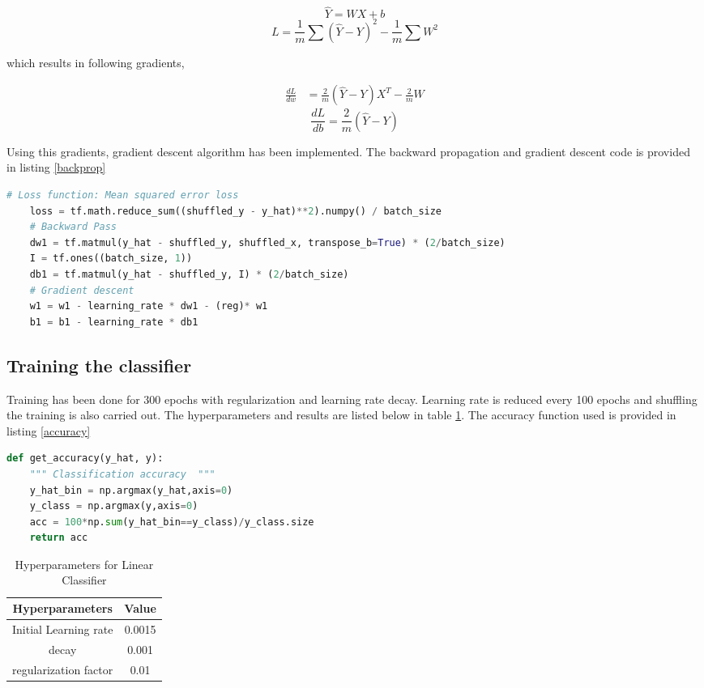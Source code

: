 \documentclass[a4paper, 12pt]{article}
\begin{document}
			\begin{multicols}{2}
				\noindent
				\begin{equation}
					\hat{Y}  = WX + b
				\end{equation}
				\begin{equation}
						L = \frac{1}{m}\sum{(\hat{Y}-Y)^2} - \frac{1}{m}\sum W^2
				\end{equation}
			\end{multicols}
			which results in following gradients,
			\noindent
			\begin{multicols}{2}
				\noindent
				\begin{align*}
					\frac{dL}{dw} &= \frac{2}{m}(\hat{Y} - Y)X^T - \frac{2}{m}W
				\end{align*}
				\begin{equation*}
					\frac{dL}{db} = \frac{2}{m}(\hat{Y} - Y)
				\end{equation*}
			\end{multicols}
		Using this gradients, gradient descent algorithm has been implemented. The backward propagation and gradient descent code is provided in listing \ref{backprop}
\begin{lstlisting}[language=python, caption=Backward Propagation and Gradient Descent, label=backprop] 
	# Loss function: Mean squared error loss
	loss = tf.math.reduce_sum((shuffled_y - y_hat)**2).numpy() / batch_size
	# Backward Pass
	dw1 = tf.matmul(y_hat - shuffled_y, shuffled_x, transpose_b=True) * (2/batch_size) 
	I = tf.ones((batch_size, 1))
	db1 = tf.matmul(y_hat - shuffled_y, I) * (2/batch_size)
	# Gradient descent
	w1 = w1 - learning_rate * dw1 - (reg)* w1
	b1 = b1 - learning_rate * db1
\end{lstlisting}
		\subsection{Training the classifier}
			Training has been done for 300 epochs with regularization and learning rate decay. Learning rate is reduced every 100 epochs and shuffling the training is also carried out. The hyperparameters and results are listed below in table \ref{param1}. The accuracy function used is provided in listing \ref{accuracy}
\begin{lstlisting}[language= Python, caption= Accuracy function used in Q1 Q2 and Q3, label=accuracy ]
def get_accuracy(y_hat, y):
	""" Classification accuracy  """
	y_hat_bin = np.argmax(y_hat,axis=0)
	y_class = np.argmax(y,axis=0)
	acc = 100*np.sum(y_hat_bin==y_class)/y_class.size
	return acc
\end{lstlisting}
			\begin{table}[h]
				\centering
				\begin{tabular}{|c|c|}
					\hline
					Hyperparameters & Value \\
					\hline
					Initial Learning rate & 0.0015 \\
					decay	& 0.001 \\
					regularization factor & 0.01 \\
					\hline
				\end{tabular}
				\caption{Hyperparameters for Linear Classifier}
				\label{param1}
			\end{table}
\end{document}

